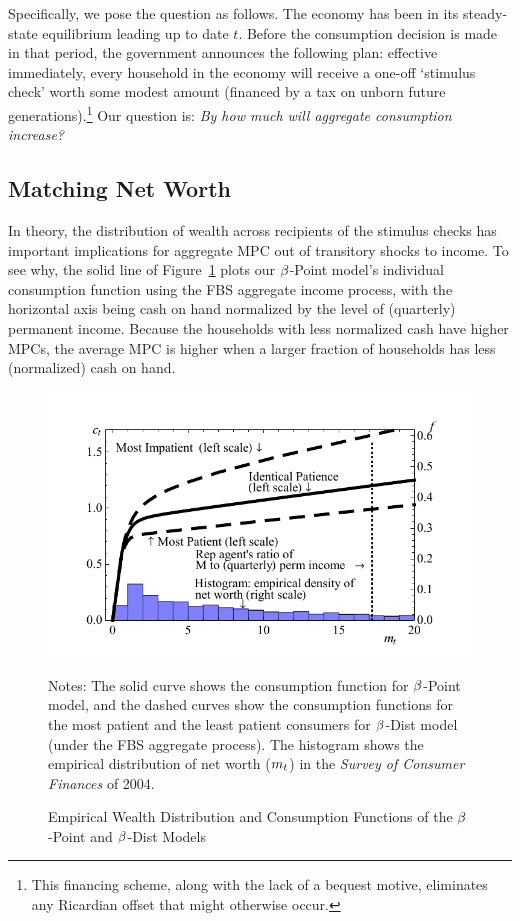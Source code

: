 \documentclass[12pt,titlepage]{econtex}
\begin{document}
Specifically, we pose the question as follows.  The economy has been
in its steady-state equilibrium leading up to date $t$.  Before the
consumption decision is made in that period, the government announces
the following plan: effective immediately, every household in the
economy will receive a one-off `stimulus check' worth some modest
amount (financed by a tax on unborn future
generations).\footnote{This financing scheme, along with the lack of a
  bequest motive, eliminates any Ricardian offset that might otherwise
  occur.} Our question is: \emph{By how much will aggregate consumption increase?}

\subsection{Matching Net Worth}

In theory, the distribution of wealth across recipients of the stimulus checks has important implications for aggregate MPC out
of transitory shocks to income. To see why, the solid line of Figure~\ref{CFuncDistSevenPointPermAndHistNetWorthPlotFedQuarterly} plots our $\beta$-Point model's individual
consumption function using the FBS aggregate income process, with the
horizontal axis being cash on hand normalized by the level of
(quarterly) permanent income. Because the households with less normalized cash have higher MPCs, the average MPC is higher when a larger fraction of households has less (normalized) cash on hand.

\begin{figure}
    \caption{Empirical Wealth Distribution and Consumption Functions of the
      $\beta$-Point and $\beta$-Dist Models}
    \label{CFuncDistSevenPointPermAndHistNetWorthPlotFedQuarterly}
  \begin{center}
    \includegraphics[scale=1.25]{./Figures/CFuncDistSevenPointPermAndHistNetWorthPlotFedQuarterly}
  \end{center}
    \footnotesize Notes: The solid curve shows the consumption function
    for $\beta$-Point model, and the dashed curves show the consumption functions
    for the most patient and the least patient consumers for
    $\beta$-Dist model (under the FBS aggregate process). The histogram shows the empirical distribution of
    net worth ($m_{t}$) in the \emph{Survey of Consumer Finances} of 2004.
\end{figure}
\end{document}

